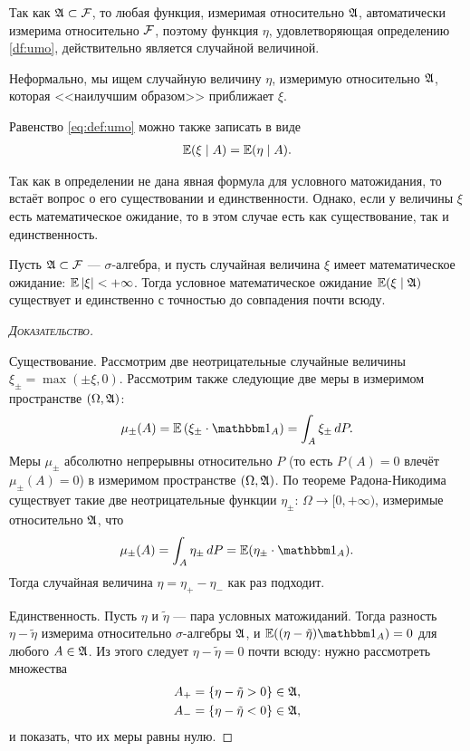 \documentclass[../main.tex]{subfiles}
\begin{document}
 \begin{remrk*}
  Так как $ \mathfrak A \subset \mathcal F $, то любая функция, измеримая относительно $ \mathfrak A $, автоматически измерима относительно $ \mathcal F $, поэтому функция $ \eta $, удовлетворяющая определению \ref{df:umo}, действительно является случайной величиной.
 \end{remrk*}

 Неформально, мы ищем случайную величину $ \eta $, измеримую относительно $ \mathfrak A $, которая <<наилучшим образом>> приближает $ \xi $.

 Равенство \eqref{eq:def:umo} можно также записать в виде
 \begin{align*}
  \mathbb E(\xi \mid A) = \mathbb E(\eta \mid A).
 \end{align*}

 Так как в определении не дана явная формула для условного матожидания, то встаёт вопрос о его существовании и единственности. Однако, если у величины $ \xi $ есть математическое ожидание, то в этом случае есть как существование, так и единственность.

 \begin{thm}
  Пусть $ \mathfrak A \subset \mathcal F $ --- $ \sigma $-алгебра, и пусть случайная величина $ \xi $ имеет математическое ожидание: $ \mathbb E \left| \xi \right| < +\infty $. Тогда условное математическое ожидание $ \mathbb E(\xi\mid\mathfrak A) $ существует и единственно с точностью до совпадения почти всюду.
 \end{thm}
 \begin{proof}[\normalfont\textsc{Доказательство}]\

  Существование. Рассмотрим две неотрицательные случайные величины $ \xi_\pm = \max(\pm \xi, 0) $. Рассмотрим также следующие две меры в измеримом пространстве $ (\Omega,\mathfrak A)$:
  \begin{align*}
   \mu_\pm (A) = \E \left( \xi_\pm \cdot \Ind_A \right) = \int_{A} \xi_\pm \,dP. 
  \end{align*} Меры $ \mu_\pm $ абсолютно непрерывны относительно $ P $ (то есть $ P(A) = 0 $ влечёт $ \mu_\pm(A) = 0 $) в измеримом пространстве $ (\Omega,\mathfrak A) $. По теореме Радона-Никодима существует такие две неотрицательные функции $ \eta_\pm \colon\, \Omega \to [0, +\infty)  $, измеримые относительно $ \mathfrak A $, что
  \begin{align*}
   \mu_\pm (A) = \int_{A} \eta_\pm \, dP = \E (\eta_\pm \cdot \Ind_A).
  \end{align*} Тогда случайная величина $ \eta = \eta_+ - \eta_- $ как раз подходит.

  Единственность. Пусть $ \eta $ и $ \tilde \eta $ --- пара условных матожиданий. Тогда
  разность $ \eta - \tilde \eta $ измерима относительно $ \sigma $-алгебры $ \mathfrak A $, и $ \E((\eta-\tilde\eta) \Ind_A) = 0 $ для любого $ A \in \mathfrak A $. Из этого следует $ \eta - \tilde\eta = 0 $ почти всюду: нужно рассмотреть множества
  \begin{align*}
   A_+ &= \left\{ \eta - \tilde\eta > 0 \right\} \in \mathfrak A, \\
   A_- &= \left\{ \eta - \tilde\eta < 0 \right\} \in \mathfrak A,
  \end{align*} и показать, что их меры равны нулю.
 \end{proof}
\end{document}
